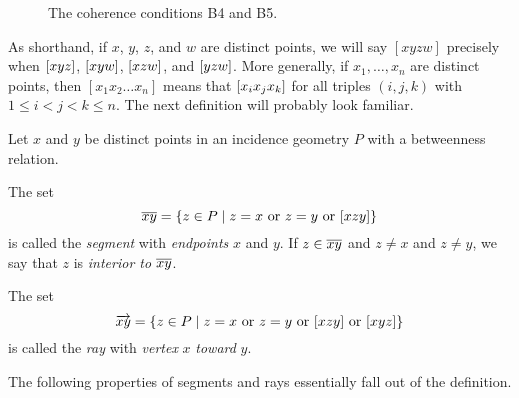 \begin{figure}
\begin{center}
\caption{\label{fig:betweenness-coherence}The coherence conditions B4 and B5.}
\end{center}
\end{figure}

As shorthand, if \(x\), \(y\), \(z\), and \(w\) are distinct points, we will say \([xyzw]\) precisely when \([ x y z ]\), \([ x y w ]\), \([ x z w ]\), and \([ y z w ]\).
More generally, if \(x_1, \ldots, x_n\) are distinct points, then \([x_1x_2 \ldots x_n]\) means that \([ x_i x_j x_k ]\) for all triples \((i,j,k)\) with \(1 \leq i < j < k \leq n\).
The next definition will probably look familiar.

\begin{dfn}
Let \(x\) and \(y\) be distinct points in an incidence geometry \(P\) with a betweenness relation.
\begin{proplist}
\item The set \[ \overline{xy} = \{ z \in P \mid z = x\ \mathrm{or}\ z = y\ \mathrm{or}\ [ x z y ] \} \] is called the \emph{segment} with \emph{endpoints} \(x\) and \(y\).
If \(z \in \overline{xy}\) and \(z \neq x\) and \(z \neq y\), we say that \(z\) is \emph{interior to} \(\overline{xy}\).
\item The set \[ \RAY{x}{y} = \{ z \in P \mid z = x\ \mathrm{or}\ z = y\ \mathrm{or}\ \BETWEEN{x}{z}{y}\ \mathrm{or}\ \BETWEEN{x}{y}{z} \} \] is called the \emph{ray} with \emph{vertex} \(x\) \emph{toward} \(y\).
\end{proplist}
\end{dfn}

The following properties of segments and rays essentially fall out of the definition.


